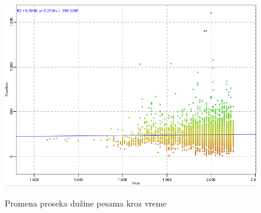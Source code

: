 \begin{figure}[H]
    \centering
    \includegraphics[scale=0.4]{resources/year-duration.PNG}
    \label{fig:YearDurationAvg}
    \caption{Promena proseka du\v{z}ine pesama kroz vreme}
\end{figure}
